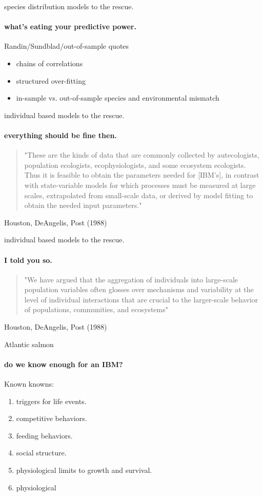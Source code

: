 \documentclass[show notes]{beamer}
\begin{document}
\begin{frame}{species distribution models to the rescue.}
  \framesubtitle{what's eating your predictive power.} 
   
   Randin/Sundblad/out-of-sample quotes
   \begin{itemize}
   \item chains of correlations
   \item structured over-fitting
   \item in-sample vs. out-of-sample species and environmental mismatch
   \end{itemize}

\end{frame}



\begin{frame}{individual based models to the rescue.}
  \framesubtitle{everything should be fine then.} 

\begin{quote}
"These are the kinds of data that are commonly collected 
by autecologists, population ecologists, ecophysiologists, and some 
ecosystem ecologists. Thus it is feasible to obtain the parameters needed 
for [IBM's], in contrast with state-variable models for 
which processes must be measured at large scales, extrapolated from 
small-scale data, or derived by model fitting to obtain the needed input parameters."
\end{quote}
Houston, DeAngelis, Post (1988)

\end{frame}

\begin{frame}{individual based models to the rescue.}
  \framesubtitle{I told you so.} 

\begin{quote}
"We have argued that the aggregation of individuals 
into large-scale population variables often glosses over mechanisms and 
variability at the level of individual interactions that are crucial 
to the larger-scale behavior of populations, communities, and ecosystems"
\end{quote}
Houston, DeAngelis, Post (1988)
  
\end{frame}

\begin{frame}{Atlantic salmon}
	\framesubtitle{do we know enough for an IBM?}
    
    Known knowns:
    \begin{enumerate}
    \item triggers for life events.
    \item competitive behaviors.
    \item feeding behaviors.
    \item social structure.
    \item physiological limits to growth and survival.
    \item physiological 
    \end{enumerate}


\end{frame}
\end{document}

